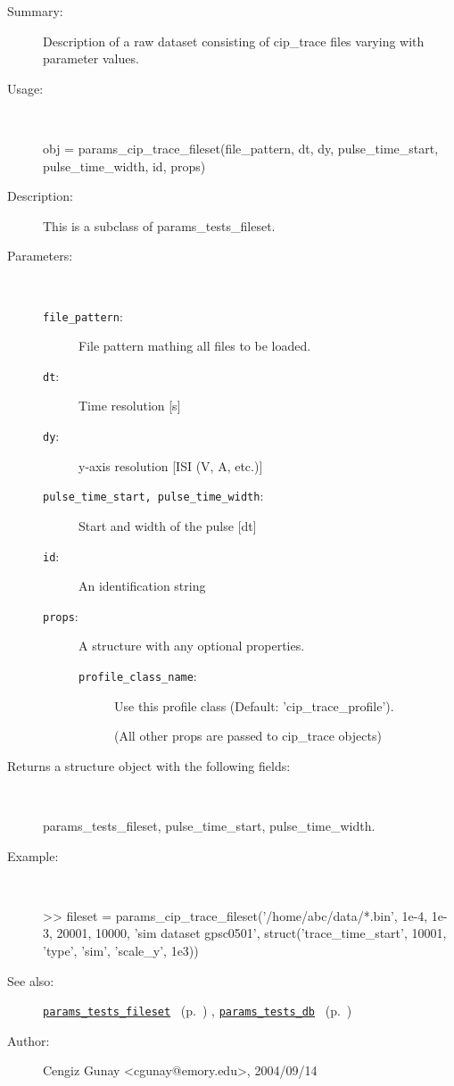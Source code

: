\begin{description}
\item[Summary:]Description of a raw dataset consisting of cip\_trace files varying 
	with parameter values.
%
\item[Usage:]~%
\begin{lyxcode}%
obj = params\_cip\_trace\_fileset(file\_pattern, dt, dy, 
				 pulse\_time\_start, pulse\_time\_width, id, props)
%
\end{lyxcode}%
%
\item[Description:]%
This is a subclass of params\_tests\_fileset.
\item[Parameters:]~
\begin{description}%
\item[\texttt{file\_pattern}:]
 File pattern mathing all files to be loaded.
\item[\texttt{dt}:]
 Time resolution [s]
\item[\texttt{dy}:]
 y-axis resolution [ISI (V, A, etc.)]
\item[\texttt{pulse\_time\_start, pulse\_time\_width}:]


Start and width of the pulse [dt]\item[\texttt{id}:]
 An identification string
\item[\texttt{props}:]
 A structure with any optional properties.
\begin{description}%
\item[\texttt{profile\_class\_name}:]
 Use this profile class (Default: 'cip\_trace\_profile').

(All other props are passed to cip\_trace objects)\end{description}%
\end{description}%
%
\item[Returns a structure object with the following fields:]~

	params\_tests\_fileset,
	pulse\_time\_start, pulse\_time\_width.
%
\item[Example:]~
\begin{lyxcode}        >> fileset = params\_cip\_trace\_fileset('/home/abc/data/*.bin', 1e-4, 1e-3, 20001, 10000, 'sim dataset gpsc0501', struct('trace\_time\_start', 10001, 'type', 'sim', 'scale\_y', 1e3))\\%
\end{lyxcode}
%
\item[See also:]%
\hyperlink{ref_params_tests_fileset}{\texttt{params\_tests\_fileset}}%
\ (p.~\pageref{ref_params_tests_fileset})%
%
, \hyperlink{ref_params_tests_db}{\texttt{params\_tests\_db}}%
\ (p.~\pageref{ref_params_tests_db})%
%
%
\item[Author:]%
Cengiz Gunay <cgunay@emory.edu>, 2004/09/14%
\end{description}
\methodline%
